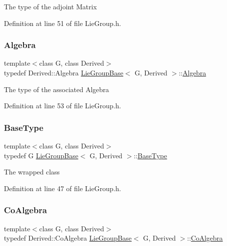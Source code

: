 The type of the adjoint Matrix 

Definition at line 51 of file Lie\+Group.\+h.

\hypertarget{class_lie_group_base_a3730354b1a76881717834e3dfd3187bd}{}\label{class_lie_group_base_a3730354b1a76881717834e3dfd3187bd} 
\subsubsection{\texorpdfstring{Algebra}{Algebra}}
{\footnotesize\ttfamily template$<$class G, class Derived$>$ \\
typedef Derived\+::\+Algebra \hyperlink{class_lie_group_base}{Lie\+Group\+Base}$<$ G, Derived $>$\+::\hyperlink{class_lie_group_base_a3730354b1a76881717834e3dfd3187bd}{Algebra}}

The type of the associated Algebra 

Definition at line 53 of file Lie\+Group.\+h.

\hypertarget{class_lie_group_base_a895bed679f100c71c6dcbfd5532635b0}{}\label{class_lie_group_base_a895bed679f100c71c6dcbfd5532635b0} 
\subsubsection{\texorpdfstring{Base\+Type}{BaseType}}
{\footnotesize\ttfamily template$<$class G, class Derived$>$ \\
typedef G \hyperlink{class_lie_group_base}{Lie\+Group\+Base}$<$ G, Derived $>$\+::\hyperlink{class_lie_group_base_a895bed679f100c71c6dcbfd5532635b0}{Base\+Type}}

The wrapped class 

Definition at line 47 of file Lie\+Group.\+h.

\hypertarget{class_lie_group_base_a7d87259a140110af06f8bca9933b878d}{}\label{class_lie_group_base_a7d87259a140110af06f8bca9933b878d} 
\subsubsection{\texorpdfstring{Co\+Algebra}{CoAlgebra}}
{\footnotesize\ttfamily template$<$class G, class Derived$>$ \\
typedef Derived\+::\+Co\+Algebra \hyperlink{class_lie_group_base}{Lie\+Group\+Base}$<$ G, Derived $>$\+::\hyperlink{class_lie_group_base_a7d87259a140110af06f8bca9933b878d}{Co\+Algebra}}

